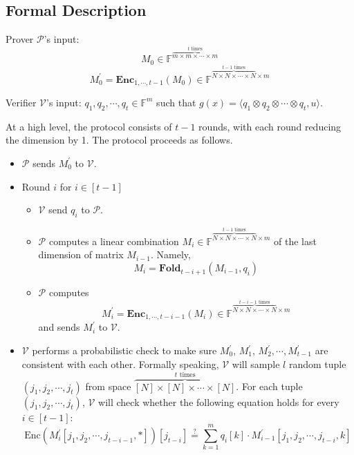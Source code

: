 \subsection{Formal Description}

Prover $\mathcal{P}$'s input: 
$$
    M_0 \in \mathbb{F}^{\overbrace{m \times m \times \cdots \times m}^{t \text{ times}}}
$$
$$
    M_0^{\prime} = \textbf{Enc}_{1,\cdots,t-1}(M_0) \in \mathbb{F}^{\overbrace{N \times N \times \cdots \times N}^{t-1 \text{ times}} \times m}
$$

Verifier $\mathcal{V}$'s input: $q_1, q_2, \cdots, q_t \in \mathbb{F}^{m}$ such that $g(x) =\langle q_1 \otimes q_2 \otimes \cdots \otimes q_t, u \rangle$.

At a high level, the protocol consists of $t-1$ rounds, with each round reducing the dimension by 1. The protocol proceeds as follows. 

\begin{itemize}
    \item $\mathcal{P}$ sends $M_0^{\prime}$ to $\mathcal{V}$.
    
    \item Round $i$ for $i \in [t-1]$
    
    \begin{itemize}
        \item $\mathcal{V}$ send $q_i$ to $\mathcal{P}$.
        \item $\mathcal{P}$ computes a linear combination 
        $M_i \in \mathbb{F}^{\overbrace{N \times N \times \cdots \times N}^{t-1 \text{ times}} \times m}$ of the last dimension of matrix $M_{i-1}$. Namely,
$$
    M_i = \textbf{Fold}_{t-i+1}(M_{i-1}, q_i)
$$

        \item $\mathcal{P}$ computes 
$$
    M_i^\prime =  \textbf{Enc}_{1,\cdots,t-i-1}(M_i)\in \mathbb{F}^{\overbrace{N \times N \times \cdots \times N}^{t-i-1 \text{ times}} \times m}
$$    
        and sends $M_i^\prime$ to $\mathcal{V}$.
    \end{itemize}
    
    \item $\mathcal{V}$ performs a probabilistic check to make sure $M_0^\prime$, $M_1^\prime$, $M_2^\prime, \cdots, M_{t-1}^\prime$ are consistent with each other. Formally speaking, $\mathcal{V}$ will sample $l$ random tuple $(j_1, j_2, \cdots, j_t)$ from space $\overbrace{[N] \times [N] \times \cdots \times [N]}^{t \text{ times}}$. 
    For each tuple $(j_1, j_2, \cdots, j_t)$, 
    $\mathcal{V}$ will check whether the following equation holds for every $i \in [t-1]$:
$$
    \text{Enc}(M_i^\prime[j_1, j_2, \cdots, j_{t-i-1}, *])[j_{t-i}] \stackrel{?}{=} \sum_{k=1}^m q_i[k] \cdot M_{i-1}^{\prime}[j_1,j_2, \cdots, j_{t-i},k]
$$
\end{itemize}


